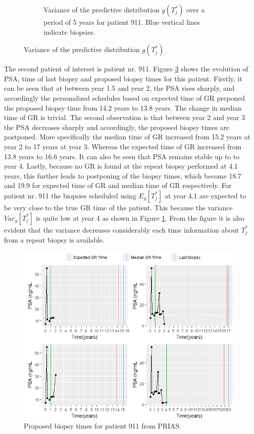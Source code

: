 \begin{figure}[!htb]
\begin{subfigure}[b]{0.45\textwidth}
        \caption{Variance of the predictive distribution $g(T^*_j)$ over a period of 5 years for patient 911. Blue vertical lines indicate biopsies.}
        \label{fig : variance_pred_dist_911}
    \end{subfigure}      
    \caption{Variance of the predictive distribution $g(T^*_j)$}\label{fig : variance_pred_dist}
\end{figure}

The second patient of interest is patient nr. 911. Figure \ref{fig : prias_demo_pid_911} shows the evolution of PSA, time of last biopsy and proposed biopsy times for this patient. Firstly, it can be seen that at between year 1.5 and year 2, the PSA rises sharply, and accordingly the personalized schedules based on expected time of GR preponed the proposed biopsy time from 14.2 years to 13.8 years. The change in median time of GR is trivial. The second observation is that between year 2 and year 3 the PSA decreases sharply and accordingly, the proposed biopsy times are postponed. More specifically the median time of GR increased from 15.2 years at year 2 to 17 years at year 3. Whereas the expected time of GR increased from 13.8 years to 16.6 years. It can also be seen that PSA remains stable up to to year 4. Lastly, because no GR is found at the repeat biopsy performed at 4.1 years, this further leads to postponing of the biopsy times, which become 18.7 and 19.9 for expected time of GR and median time of GR respectively. For patient nr. 911 the biopsies scheduled using $E_g[T^*_j]$ at year 4.1 are expected to be very close to the true GR time of the patient. This because the variance $Var_g[T^*_j]$ is quite low at year 4 as shown in Figure \ref{fig : variance_pred_dist_911}. From the figure it is also evident that the variance decreases considerably each time information about $T^*_j$ from a repeat biopsy is available.\\

\begin{figure}[!htb]
\centering
\captionsetup{justification=centering}
\includegraphics[width=\textwidth]{images/prias_demo/case_911.png}
\caption{\label{fig : prias_demo_pid_911} Proposed biopsy times for patient 911 from PRIAS.}
\end{figure}

